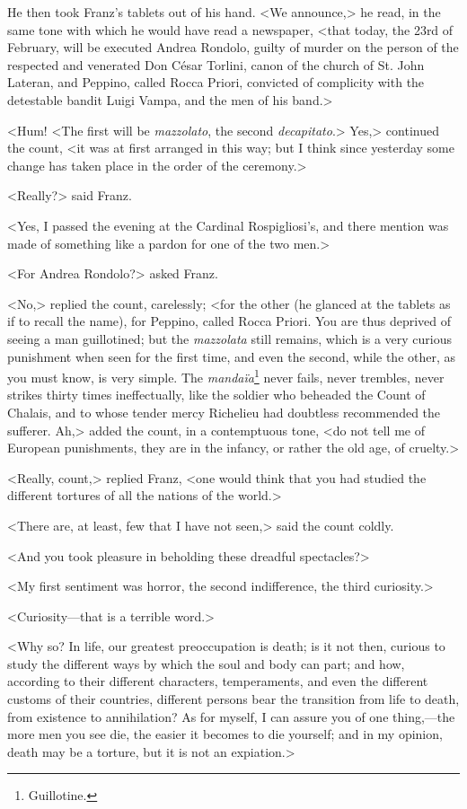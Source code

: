  He then took Franz's tablets out of his hand. <We announce,> he read, in the same tone with which he would have read a newspaper, <that today, the 23rd of February, will be executed Andrea Rondolo, guilty of murder on the person of the respected and venerated Don César Torlini, canon of the church of St. John Lateran, and Peppino, called Rocca Priori, convicted of complicity with the detestable bandit Luigi Vampa, and the men of his band.> 

 <Hum! <The first will be \textit{mazzolato}, the second \textit{decapitato}.> Yes,> continued the count, <it was at first arranged in this way; but I think since yesterday some change has taken place in the order of the ceremony.> 

 <Really?> said Franz. 

 <Yes, I passed the evening at the Cardinal Rospigliosi's, and there mention was made of something like a pardon for one of the two men.> 

 <For Andrea Rondolo?> asked Franz. 

 <No,> replied the count, carelessly; <for the other (he glanced at the tablets as if to recall the name), for Peppino, called Rocca Priori. You are thus deprived of seeing a man guillotined; but the \textit{mazzolata} still remains, which is a very curious punishment when seen for the first time, and even the second, while the other, as you must know, is very simple. The \textit{mandaïa}\footnote{Guillotine.} never fails, never trembles, never strikes thirty times ineffectually, like the soldier who beheaded the Count of Chalais, and to whose tender mercy Richelieu had doubtless recommended the sufferer. Ah,> added the count, in a contemptuous tone, <do not tell me of European punishments, they are in the infancy, or rather the old age, of cruelty.> 

 <Really, count,> replied Franz, <one would think that you had studied the different tortures of all the nations of the world.> 

 <There are, at least, few that I have not seen,> said the count coldly. 

 <And you took pleasure in beholding these dreadful spectacles?> 

 <My first sentiment was horror, the second indifference, the third curiosity.> 

 <Curiosity—that is a terrible word.> 

 <Why so? In life, our greatest preoccupation is death; is it not then, curious to study the different ways by which the soul and body can part; and how, according to their different characters, temperaments, and even the different customs of their countries, different persons bear the transition from life to death, from existence to annihilation? As for myself, I can assure you of one thing,—the more men you see die, the easier it becomes to die yourself; and in my opinion, death may be a torture, but it is not an expiation.> 

